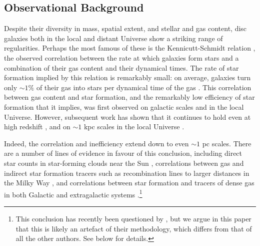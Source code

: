 \documentclass[useAMS,usenatbib]{mn2e}
\begin{document}
\subsection{Observational Background}

Despite their diversity in mass, spatial extent, and stellar and gas content, disc galaxies both in the local and distant Universe show a striking range of regularities. Perhaps the most famous of these is the Kennicutt-Schmidt relation \citep[see reviews by][]{kennicutt98a, kennicutt12a, krumholz14c}, the observed correlation between the rate at which galaxies form stars and a combination of their gas content and their dynamical times. The rate of star formation implied by this relation is remarkably small: on average, galaxies turn only $\sim 1\%$ of their gas into stars per dynamical time of the gas \citep{zuckerman74a}. This correlation between gas content and star formation, and the remarkably low efficiency of star formation that it implies, was first observed on galactic scales and in the local Universe. However, subsequent work has shown that it continues to hold even at high redshift \citep[e.g.,][]{bouche07a, daddi08a, daddi10a, daddi10b, genzel10a, tacconi13a}, and on $\sim 1$ kpc scales in the local Universe \citep{kennicutt07a, bigiel08a, leroy08a, leroy13a, liu11a, momose13a}.

Indeed, the correlation and inefficiency extend down to even $\sim 1$ pc scales. There are a number of lines of evidence in favour of this conclusion, including direct star counts in star-forming clouds near the Sun \citep{lada10a, heiderman10a, krumholz12a, evans14a, salim15a, heyer16a}, correlations between gas and indirect star formation tracers such as recombination lines to larger distances in the Milky Way \citep{vutisalchavakul16a}, and correlations between star formation and tracers of dense gas in both Galactic and extragalactic systems \citep{krumholz07e, garcia-burillo12a, usero15a}.\footnote{This conclusion has recently been questioned by \citet{lee16a}, but we argue in this paper that this is likely an artefact of their methodology, which differs from that of all the other authors. See below for details.}
\end{document}
